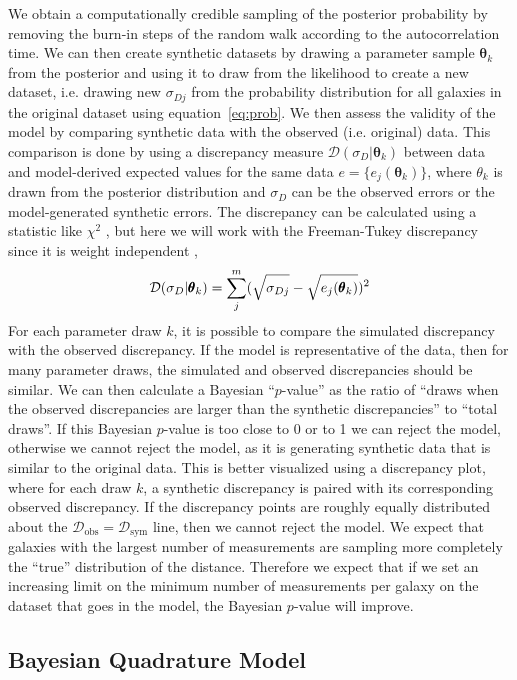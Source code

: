 \documentclass[a4paper,fleqn,usenatbib]{mnras}
\begin{document}
We obtain a computationally credible sampling of the posterior probability by removing the burn-in steps of the random walk according to the autocorrelation time. We can then create synthetic datasets by drawing a parameter sample $\pmb{\theta}_k$ from the posterior and using it to draw from the likelihood to create a new dataset, i.e. drawing new $\sigma_{Dj}$ from the probability distribution for all galaxies in the original dataset using equation~\ref{eq:prob}. We then assess the validity of the model by comparing synthetic data with the observed (i.e. original) data. This comparison is done by using a discrepancy measure $\mathcal{D}(\sigma_D|\pmb{\theta}_k)$ between data and model-derived expected values for the same data $e=\{e_j(\pmb{\theta}_k)\}$, where $\theta_k$ is drawn from the posterior distribution and $\sigma_D$ can be the observed errors or the model-generated synthetic errors. The discrepancy can be calculated using a statistic like $\chi^2$ \citep{chi2ms,otherdisc}, but here we will work with the Freeman-Tukey discrepancy since it is weight independent \citep{bishopft,brooks}, 
\[\mathcal{D}(\sigma_D|\pmb{\theta}_k)=\sum_j^m(\sqrt{\sigma_{Dj}\vphantom{e_j(\pmb{\theta}_k)}}-\sqrt{e_j(\pmb{\theta}_k)})^2\]
For each parameter draw $k$, it is possible to compare the simulated discrepancy with the observed discrepancy. If the model is representative of the data, then for many parameter draws, the simulated and observed discrepancies should be similar. We can then calculate a Bayesian ``$p$-value'' as the ratio of ``draws when the observed discrepancies are larger than the synthetic discrepancies'' to ``total draws''. If this Bayesian $p$-value is too close to 0 or to 1 we can reject the model, otherwise we cannot reject the model, as it is generating synthetic data that is similar to the original data. This is better visualized using a discrepancy plot, where for each draw $k$, a synthetic discrepancy is paired with its corresponding observed discrepancy. If the discrepancy points are roughly equally distributed about the $\mathcal{D}_\mathrm{obs}=\mathcal{D}_\mathrm{sym}$ line, then we cannot reject the model. We expect that galaxies with the largest number of measurements are sampling more completely the ``true'' distribution of the distance. Therefore we expect that if we set an increasing limit on the minimum number of measurements per galaxy on the dataset that goes in the model, the Bayesian $p$-value will improve.

\subsection{Bayesian Quadrature Model}
\label{sec:bqm} 
\end{document}
